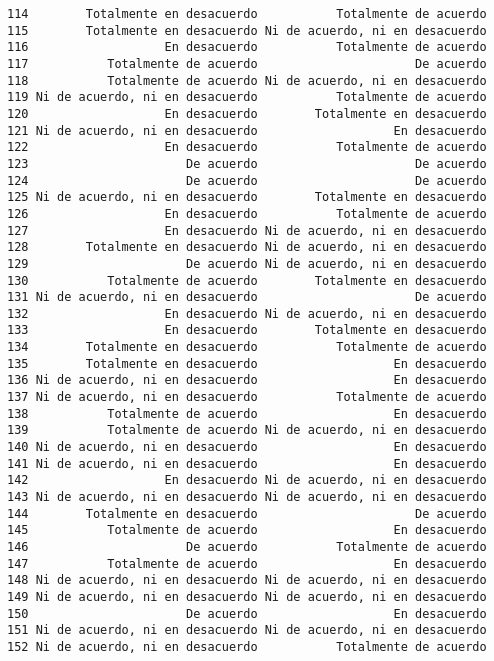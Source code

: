 \documentclass[
  letterpaper,
  DIV=11,
  numbers=noendperiod]{scrartcl}
\begin{document}
\begin{verbatim}
114        Totalmente en desacuerdo           Totalmente de acuerdo
115        Totalmente en desacuerdo Ni de acuerdo, ni en desacuerdo
116                   En desacuerdo           Totalmente de acuerdo
117           Totalmente de acuerdo                      De acuerdo
118           Totalmente de acuerdo Ni de acuerdo, ni en desacuerdo
119 Ni de acuerdo, ni en desacuerdo           Totalmente de acuerdo
120                   En desacuerdo        Totalmente en desacuerdo
121 Ni de acuerdo, ni en desacuerdo                   En desacuerdo
122                   En desacuerdo           Totalmente de acuerdo
123                      De acuerdo                      De acuerdo
124                      De acuerdo                      De acuerdo
125 Ni de acuerdo, ni en desacuerdo        Totalmente en desacuerdo
126                   En desacuerdo           Totalmente de acuerdo
127                   En desacuerdo Ni de acuerdo, ni en desacuerdo
128        Totalmente en desacuerdo Ni de acuerdo, ni en desacuerdo
129                      De acuerdo Ni de acuerdo, ni en desacuerdo
130           Totalmente de acuerdo        Totalmente en desacuerdo
131 Ni de acuerdo, ni en desacuerdo                      De acuerdo
132                   En desacuerdo Ni de acuerdo, ni en desacuerdo
133                   En desacuerdo        Totalmente en desacuerdo
134        Totalmente en desacuerdo           Totalmente de acuerdo
135        Totalmente en desacuerdo                   En desacuerdo
136 Ni de acuerdo, ni en desacuerdo                   En desacuerdo
137 Ni de acuerdo, ni en desacuerdo           Totalmente de acuerdo
138           Totalmente de acuerdo                   En desacuerdo
139           Totalmente de acuerdo Ni de acuerdo, ni en desacuerdo
140 Ni de acuerdo, ni en desacuerdo                   En desacuerdo
141 Ni de acuerdo, ni en desacuerdo                   En desacuerdo
142                   En desacuerdo Ni de acuerdo, ni en desacuerdo
143 Ni de acuerdo, ni en desacuerdo Ni de acuerdo, ni en desacuerdo
144        Totalmente en desacuerdo                      De acuerdo
145           Totalmente de acuerdo                   En desacuerdo
146                      De acuerdo           Totalmente de acuerdo
147           Totalmente de acuerdo                   En desacuerdo
148 Ni de acuerdo, ni en desacuerdo Ni de acuerdo, ni en desacuerdo
149 Ni de acuerdo, ni en desacuerdo Ni de acuerdo, ni en desacuerdo
150                      De acuerdo                   En desacuerdo
151 Ni de acuerdo, ni en desacuerdo Ni de acuerdo, ni en desacuerdo
152 Ni de acuerdo, ni en desacuerdo           Totalmente de acuerdo

\end{verbatim}
\end{document}
